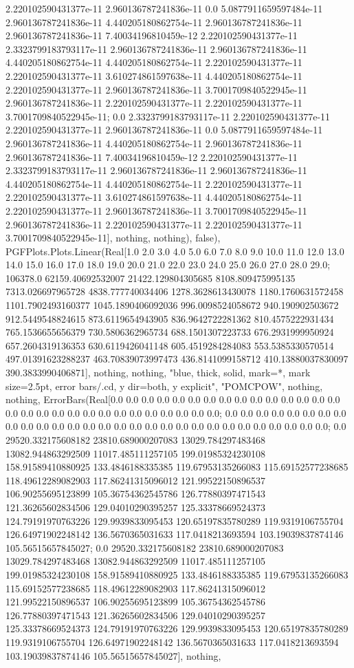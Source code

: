 \documentclass[tikz]{standalone}
\begin{document}
2.220102590431377e-11 2.960136787241836e-11 0.0 5.0877911659597484e-11 2.960136787241836e-11 4.440205180862754e-11 2.960136787241836e-11 2.960136787241836e-11 7.40034196810459e-12 2.220102590431377e-11 2.3323799183793117e-11 2.960136787241836e-11 2.960136787241836e-11 4.440205180862754e-11 4.440205180862754e-11 2.220102590431377e-11 2.220102590431377e-11 3.610274861597638e-11 4.440205180862754e-11 2.220102590431377e-11 2.960136787241836e-11 3.7001709840522945e-11 2.960136787241836e-11 2.220102590431377e-11 2.220102590431377e-11 3.7001709840522945e-11; 0.0 2.3323799183793117e-11 2.220102590431377e-11 2.220102590431377e-11 2.960136787241836e-11 0.0 5.0877911659597484e-11 2.960136787241836e-11 4.440205180862754e-11 2.960136787241836e-11 2.960136787241836e-11 7.40034196810459e-12 2.220102590431377e-11 2.3323799183793117e-11 2.960136787241836e-11 2.960136787241836e-11 4.440205180862754e-11 4.440205180862754e-11 2.220102590431377e-11 2.220102590431377e-11 3.610274861597638e-11 4.440205180862754e-11 2.220102590431377e-11 2.960136787241836e-11 3.7001709840522945e-11 2.960136787241836e-11 2.220102590431377e-11 2.220102590431377e-11 3.7001709840522945e-11], nothing, nothing), false), PGFPlots.Plots.Linear(Real[1.0 2.0 3.0 4.0 5.0 6.0 7.0 8.0 9.0 10.0 11.0 12.0 13.0 14.0 15.0 16.0 17.0 18.0 19.0 20.0 21.0 22.0 23.0 24.0 25.0 26.0 27.0 28.0 29.0; 106378.0 62159.40692532007 21422.129804305685 8108.809475995135 7313.026697965728 4838.777740034406 1278.3628613430078 1180.1760631572458 1101.7902493160377 1045.1890406092036 996.0098524058672 940.190902503672 912.5449548824615 873.6119654943905 836.9642722281362 810.4575222931434 765.1536655656379 730.5806362965734 688.1501307223733 676.2931999950924 657.2604319136353 630.6119426041148 605.4519284284083 553.5385330570514 497.01391623288237 463.70839073997473 436.8141099158712 410.13880037830097 390.3833990406871], nothing, nothing, "blue, thick, solid, mark=*, mark size=2.5pt, error bars/.cd, y dir=both, y explicit", "POMCPOW", nothing, nothing, ErrorBars(Real[0.0 0.0 0.0 0.0 0.0 0.0 0.0 0.0 0.0 0.0 0.0 0.0 0.0 0.0 0.0 0.0 0.0 0.0 0.0 0.0 0.0 0.0 0.0 0.0 0.0 0.0 0.0 0.0 0.0; 0.0 0.0 0.0 0.0 0.0 0.0 0.0 0.0 0.0 0.0 0.0 0.0 0.0 0.0 0.0 0.0 0.0 0.0 0.0 0.0 0.0 0.0 0.0 0.0 0.0 0.0 0.0 0.0 0.0; 0.0 29520.332175608182 23810.689000207083 13029.784297483468 13082.944863292509 11017.485111257105 199.01985324230108 158.91589410880925 133.4846188335385 119.67953135266083 115.69152577238685 118.49612289082903 117.86241315096012 121.99522150896537 106.90255695123899 105.36754362545786 126.77880397471543 121.36265602834506 129.04010290395257 125.33378669524373 124.79191970763226 129.9939833095453 120.65197835780289 119.9319106755704 126.64971902248142 136.5670365031633 117.0418213693594 103.19039837874146 105.56515657845027; 0.0 29520.332175608182 23810.689000207083 13029.784297483468 13082.944863292509 11017.485111257105 199.01985324230108 158.91589410880925 133.4846188335385 119.67953135266083 115.69152577238685 118.49612289082903 117.86241315096012 121.99522150896537 106.90255695123899 105.36754362545786 126.77880397471543 121.36265602834506 129.04010290395257 125.33378669524373 124.79191970763226 129.9939833095453 120.65197835780289 119.9319106755704 126.64971902248142 136.5670365031633 117.0418213693594 103.19039837874146 105.56515657845027], nothing, 
\end{document}

